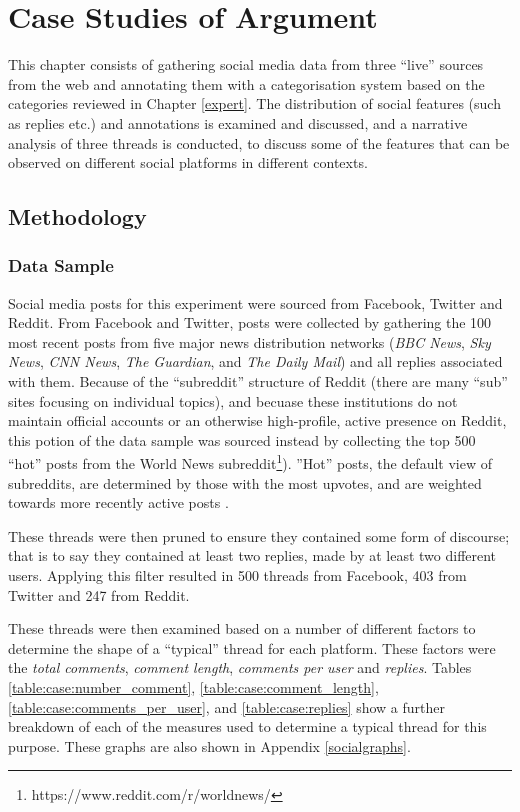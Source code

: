 \chapter{Case Studies of Argument}
\label{case}
This chapter consists of gathering social media data from three ``live'' sources from the web and annotating them with a categorisation system based on the categories reviewed in Chapter \ref{expert}. The distribution of social features (such as replies etc.) and annotations is examined and discussed, and a narrative analysis of three threads is conducted, to discuss some of the features that can be observed on different social platforms in different contexts.

\section{Methodology}

\subsection{Data Sample}
\label{case:method:sample}
Social media posts for this experiment were sourced from Facebook, Twitter and Reddit. From Facebook and Twitter, posts were collected by gathering the 100 most recent posts from five major news distribution networks (\textit{BBC News}, \textit{Sky News}, \textit{CNN News}, \textit{The Guardian}, and \textit{The Daily Mail}) and all replies associated with them. Because of the ``subreddit'' structure of Reddit (there are many ``sub'' sites focusing on individual topics), and becuase these institutions do not maintain official accounts or an otherwise high-profile, active presence on Reddit, this potion of the data sample was sourced instead by collecting the top 500 ``hot'' posts from the World News subreddit\footnote{https://www.reddit.com/r/worldnews/}). ''Hot'' posts, the default view of subreddits, are determined by those with the most upvotes, and are weighted towards more recently active posts \citep{van2011human}.

These threads were then pruned to ensure they contained some form of discourse; that is to say they contained at least two replies, made by at least two different users. Applying this filter resulted in 500 threads from Facebook, 403 from Twitter and 247 from Reddit.

These threads were then examined based on a number of different factors to determine the shape of a ``typical'' thread for each platform. These factors were the \textit{total comments}, \textit{comment length}, \textit{comments per user} and \textit{replies}. Tables \ref{table:case:number_comment}, \ref{table:case:comment_length}, \ref{table:case:comments_per_user}, and \ref{table:case:replies} show a further breakdown of each of the measures used to determine a typical thread for this purpose. These graphs are also shown in Appendix \ref{socialgraphs}.

